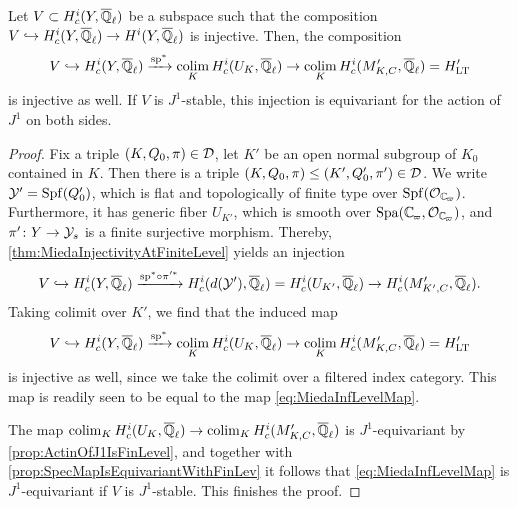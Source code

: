 \documentclass[../main.tex]{subfiles}
\begin{document}
\begin{thm}\label{thm:MiedaAppliedToLTT}
  Let $V \subset H^i_c(Y, {\overline {\mathbb{Q}}_\ell})$ be a subspace such that the composition 
  $V \hookrightarrow H^i_c(Y, {\overline {\mathbb{Q}}_\ell}) \to H^i(Y, {\overline {\mathbb{Q}}_\ell})$ is injective. Then, the composition
  \begin{equation}\label{eq:MiedaInfLevelMap}
  V \hookrightarrow H_c^i(Y, {\overline {\mathbb{Q}}_\ell}) \xrightarrow{\mathrm{sp}^*} \operatorname*{colim}_K H_c^{i}(U_K, {\overline {\mathbb{Q}}_\ell})
  \to \operatorname*{colim}_K H_c^i(M'_{K,C}, {\overline {\mathbb{Q}}_\ell}) = H_{\mathrm{LT}}'
  \end{equation}
  is injective as well. If $V$ is $J^1$-stable, this injection is equivariant 
  for the action of $J^1$ on both sides.
\begin{proof}
  Fix a triple $(K, Q_0, \pi) \in \mathcal{D}$, let $K'$ be an open normal subgroup 
  of $K_0$ contained in $K$. Then there is a triple 
  $(K, Q_0, \pi) \leq (K', Q_0', \pi') \in \mathcal{D}$. We write $\mathcal{Y}' = \operatorname{Spf}(Q_0')$,
  which is flat and topologically of finite type over $\spf(\cO_\Cp)$. 
  Furthermore, it has generic fiber $U_{K'}$, which is smooth over 
  $\spa(\Cp, \cO_\Cp)$, and $\pi'\colon Y \to \mathcal{Y}_s$ is a finite surjective
  morphism.
  Thereby, \cref{thm:MiedaInjectivityAtFiniteLevel} yields an injection
  \begin{equation*}
    V \hookrightarrow H^i_c(Y, {\overline {\mathbb{Q}}_\ell}) \xrightarrow{\mathrm{sp}^* \circ \pi'^*} 
    H_c^i(d(\mathcal{Y}'), {\overline {\mathbb{Q}}_\ell}) = H_c^i(U_{K'}, {\overline {\mathbb{Q}}_\ell}) \to H_c^i(M'_{K', C}, {\overline {\mathbb{Q}}_\ell}).
  \end{equation*}
  Taking colimit over $K'$, we find that the induced map 
  \begin{equation*}
    V \hookrightarrow H_c^i(Y, {\overline {\mathbb{Q}}_\ell}) \xrightarrow{\mathrm{sp}^*} \operatorname*{colim}_K H_c^{i}(U_K, {\overline {\mathbb{Q}}_\ell})
    \to \operatorname*{colim}_K H_c^i(M'_{K,C}, {\overline {\mathbb{Q}}_\ell}) = H_{\mathrm{LT}}'
  \end{equation*}
  is injective as well, since we take the colimit over a filtered index
  category. This map is readily seen to be equal to the map
  \eqref{eq:MiedaInfLevelMap}.

  The map $\operatorname*{colim}_K H_c^{i}(U_K, {\overline {\mathbb{Q}}_\ell}) \to \operatorname*{colim}_K H_c^i(M'_{K,C}, {\overline {\mathbb{Q}}_\ell})$
  is $J^1$-equivariant by \cref{prop:ActinOfJ1IsFinLevel}, and together with 
  \cref{prop:SpecMapIsEquivariantWithFinLev} it follows that
  \eqref{eq:MiedaInfLevelMap} is $J^1$-equivariant if $V$ is $J^1$-stable. This
  finishes the proof.
\end{proof}
\end{thm}


\end{document}
